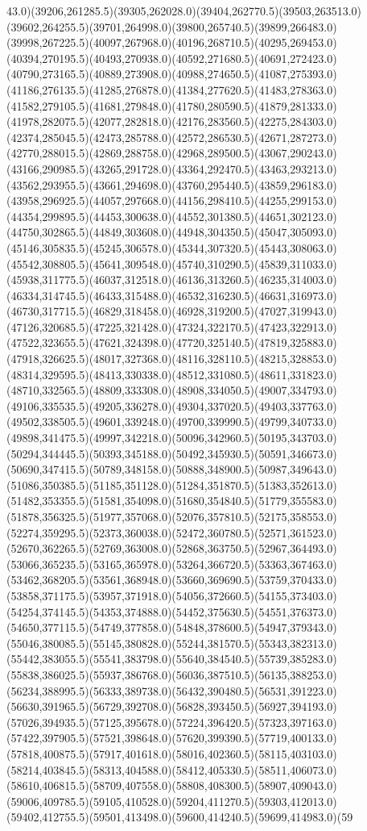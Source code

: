 \documentclass[conference]{IEEEtran}
\begin{document}
43.0)(39206,261285.5)(39305,262028.0)(39404,262770.5)(39503,263513.0)(39602,264255.5)(39701,264998.0)(39800,265740.5)(39899,266483.0)(39998,267225.5)(40097,267968.0)(40196,268710.5)(40295,269453.0)(40394,270195.5)(40493,270938.0)(40592,271680.5)(40691,272423.0)(40790,273165.5)(40889,273908.0)(40988,274650.5)(41087,275393.0)(41186,276135.5)(41285,276878.0)(41384,277620.5)(41483,278363.0)(41582,279105.5)(41681,279848.0)(41780,280590.5)(41879,281333.0)(41978,282075.5)(42077,282818.0)(42176,283560.5)(42275,284303.0)(42374,285045.5)(42473,285788.0)(42572,286530.5)(42671,287273.0)(42770,288015.5)(42869,288758.0)(42968,289500.5)(43067,290243.0)(43166,290985.5)(43265,291728.0)(43364,292470.5)(43463,293213.0)(43562,293955.5)(43661,294698.0)(43760,295440.5)(43859,296183.0)(43958,296925.5)(44057,297668.0)(44156,298410.5)(44255,299153.0)(44354,299895.5)(44453,300638.0)(44552,301380.5)(44651,302123.0)(44750,302865.5)(44849,303608.0)(44948,304350.5)(45047,305093.0)(45146,305835.5)(45245,306578.0)(45344,307320.5)(45443,308063.0)(45542,308805.5)(45641,309548.0)(45740,310290.5)(45839,311033.0)(45938,311775.5)(46037,312518.0)(46136,313260.5)(46235,314003.0)(46334,314745.5)(46433,315488.0)(46532,316230.5)(46631,316973.0)(46730,317715.5)(46829,318458.0)(46928,319200.5)(47027,319943.0)(47126,320685.5)(47225,321428.0)(47324,322170.5)(47423,322913.0)(47522,323655.5)(47621,324398.0)(47720,325140.5)(47819,325883.0)(47918,326625.5)(48017,327368.0)(48116,328110.5)(48215,328853.0)(48314,329595.5)(48413,330338.0)(48512,331080.5)(48611,331823.0)(48710,332565.5)(48809,333308.0)(48908,334050.5)(49007,334793.0)(49106,335535.5)(49205,336278.0)(49304,337020.5)(49403,337763.0)(49502,338505.5)(49601,339248.0)(49700,339990.5)(49799,340733.0)(49898,341475.5)(49997,342218.0)(50096,342960.5)(50195,343703.0)(50294,344445.5)(50393,345188.0)(50492,345930.5)(50591,346673.0)(50690,347415.5)(50789,348158.0)(50888,348900.5)(50987,349643.0)(51086,350385.5)(51185,351128.0)(51284,351870.5)(51383,352613.0)(51482,353355.5)(51581,354098.0)(51680,354840.5)(51779,355583.0)(51878,356325.5)(51977,357068.0)(52076,357810.5)(52175,358553.0)(52274,359295.5)(52373,360038.0)(52472,360780.5)(52571,361523.0)(52670,362265.5)(52769,363008.0)(52868,363750.5)(52967,364493.0)(53066,365235.5)(53165,365978.0)(53264,366720.5)(53363,367463.0)(53462,368205.5)(53561,368948.0)(53660,369690.5)(53759,370433.0)(53858,371175.5)(53957,371918.0)(54056,372660.5)(54155,373403.0)(54254,374145.5)(54353,374888.0)(54452,375630.5)(54551,376373.0)(54650,377115.5)(54749,377858.0)(54848,378600.5)(54947,379343.0)(55046,380085.5)(55145,380828.0)(55244,381570.5)(55343,382313.0)(55442,383055.5)(55541,383798.0)(55640,384540.5)(55739,385283.0)(55838,386025.5)(55937,386768.0)(56036,387510.5)(56135,388253.0)(56234,388995.5)(56333,389738.0)(56432,390480.5)(56531,391223.0)(56630,391965.5)(56729,392708.0)(56828,393450.5)(56927,394193.0)(57026,394935.5)(57125,395678.0)(57224,396420.5)(57323,397163.0)(57422,397905.5)(57521,398648.0)(57620,399390.5)(57719,400133.0)(57818,400875.5)(57917,401618.0)(58016,402360.5)(58115,403103.0)(58214,403845.5)(58313,404588.0)(58412,405330.5)(58511,406073.0)(58610,406815.5)(58709,407558.0)(58808,408300.5)(58907,409043.0)(59006,409785.5)(59105,410528.0)(59204,411270.5)(59303,412013.0)(59402,412755.5)(59501,413498.0)(59600,414240.5)(59699,414983.0)(59
\end{document}

